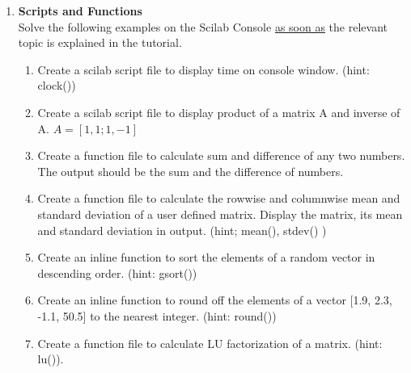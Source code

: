 \documentclass[12pt,a4paper]{article}
\newenvironment{enumcpt}{\begin{enumerate} \topsep -3mm \partopsep -3mm 
                        \parsep -3mm
                        \itemsep -0mm \leftmargin -1in \rightmargin -3mm
                        }{\end{enumerate}}
\begin{document}
\begin{multicols}{2}
\begin{enumcpt}
\begin{enumcpt}
\end{enumcpt}


\item {\bf Scripts and Functions}\\Solve the following examples on the Scilab Console \underline {as soon as} the relevant topic is explained in the tutorial.
\begin{enumcpt}

	\item Create a scilab script file to display time on console window. (hint: clock())
	\item Create a scilab script file to display product of a matrix A and inverse of A. $A =[1, 1;1, -1]$

	\item Create a function file to calculate sum and difference of any two numbers. The output should be the sum and the difference of numbers.
	\item Create a function file to calculate the rowwise and columnwise mean and standard deviation of a user defined matrix. Display the matrix, its mean and standard deviation in output. (hint; mean(), stdev() )

	\item Create an inline function to sort the elements of a random vector in descending order. (hint: gsort())
	\item Create an inline function to round off the elements of
    a vector [1.9, 2.3, -1.1, 50.5] to the nearest integer. (hint: round())
\item Create a function file to calculate LU factorization of a matrix. (hint: lu()).
	\end{enumcpt}



\end{enumcpt}
\end{multicols}
\end{document}

